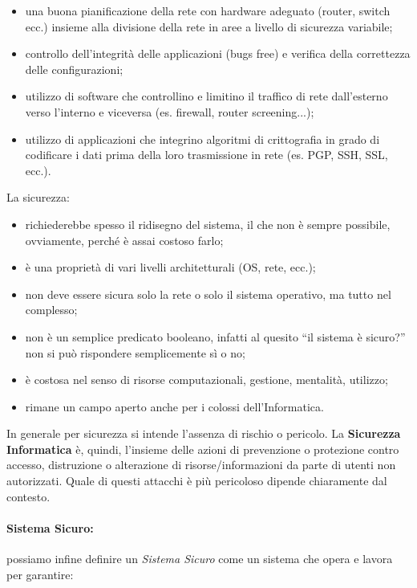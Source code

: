 \begin{itemize}
      \item una buona pianificazione della rete con hardware adeguato
            (router, switch ecc.) insieme alla divisione della rete in aree a livello
            di sicurezza variabile;
      \item controllo dell'integrità delle applicazioni (bugs free) e verifica
            della correttezza delle configurazioni;
      \item utilizzo di software che controllino e limitino il traffico di rete
            dall'esterno verso l'interno e viceversa (es. firewall, router screening...);
      \item utilizzo di applicazioni che integrino algoritmi di crittografia in
            grado di codificare i dati prima della loro trasmissione in rete
            (es. PGP, SSH, SSL, ecc.).
\end{itemize}

La sicurezza:

\begin{itemize}
      \item richiederebbe spesso il ridisegno del sistema, il che non è sempre
            possibile, ovviamente, perché è assai costoso farlo;
      \item è una proprietà di vari livelli architetturali (OS, rete, ecc.);
      \item non deve essere sicura solo la rete o solo il sistema operativo,
            ma tutto nel complesso;
      \item non è un semplice predicato booleano, infatti al quesito
            “il sistema è sicuro?” non si può
            rispondere semplicemente sì o no;
      \item è costosa nel senso di risorse computazionali, gestione, mentalità, utilizzo;
      \item rimane un campo aperto anche per i colossi dell'Informatica.
\end{itemize}

In generale per sicurezza si intende l'assenza di rischio o pericolo.
La \textbf{Sicurezza Informatica} è, quindi, l'insieme delle azioni di prevenzione
o protezione contro accesso, distruzione o alterazione di risorse/informazioni
da parte di utenti non autorizzati. Quale di questi attacchi è più pericoloso
dipende chiaramente dal contesto.

\paragraph{Sistema Sicuro:} possiamo infine definire un \textit{Sistema Sicuro}
come un sistema che opera e lavora per garantire:

